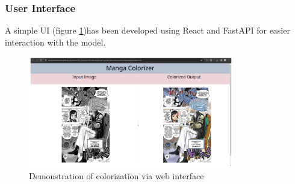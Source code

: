 \subsubsection{User Interface}
A simple UI (figure \ref{fig:fuser_interface})has been developed using React and FastAPI for easier interaction with the model.
\begin{figure}[h!]
  \centering
  \includegraphics[width=0.8\textwidth]{img/web_interface.png}
  \caption{Demonstration of colorization via web interface}
  \label{fig:fuser_interface}
\end{figure}